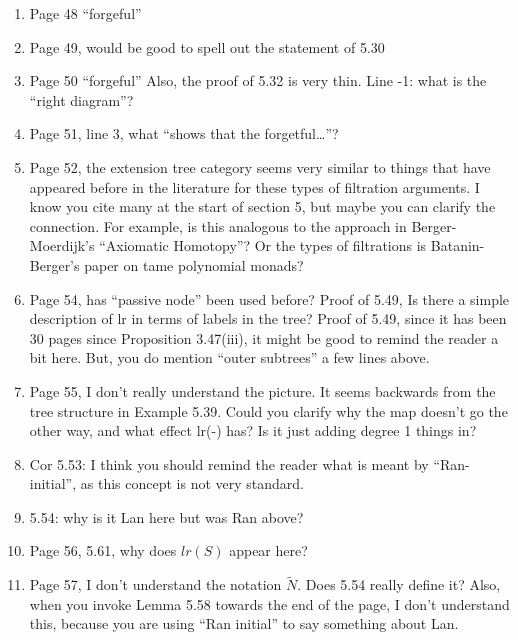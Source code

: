 \documentclass{article}
\begin{document}
\begin{enumerate}
	
	\item
	Page 48 ``forgeful''
	
	\item
	Page 49, would be good to spell out the statement of 5.30
	
	\item
	Page 50 ``forgeful''
	Also, the proof of 5.32 is very thin.
	Line -1: what is the ``right diagram''?
	
	\item
	Page 51, line 3, what ``shows that the forgetful\dots''?
	
	\item
	Page 52, the extension tree category seems very similar to things that have appeared before in the literature for these types of filtration arguments. I know you cite many at the start of section 5, but maybe you can clarify the connection. For example, is this analogous to the approach in Berger-Moerdijk's ``Axiomatic Homotopy''? Or the types of filtrations is Batanin-Berger's paper on tame polynomial monads?
	
	\item
	Page 54, has ``passive node'' been used before?
	Proof of 5.49, Is there a simple description of lr in terms of labels in the tree?
	Proof of 5.49, since it has been 30 pages since Proposition 3.47(iii), it might be good to remind the reader a bit here. But, you do mention ``outer subtrees'' a few lines above.
	
	\item
	Page 55, I don't really understand the picture. It seems backwards from the tree structure in Example 5.39. Could you clarify why the map doesn't go the other way, and what effect lr(-) has? Is it just adding degree 1 things in?
	
	\item
	Cor 5.53: I think you should remind the reader what is meant by ``Ran-initial'', as this concept is not very standard.
	
	\item
	5.54: why is it Lan here but was Ran above?
	
	\item
	Page 56, 5.61, why does $lr(S)$ appear here?
	
	
	\item
	Page 57, I don't understand the notation $\tilde{N}$. Does 5.54 really define it?
	Also, when you invoke Lemma 5.58 towards the end of the page, I don't understand this, because you are using ``Ran initial'' to say something about Lan.
	

\end{enumerate}
\end{document}
